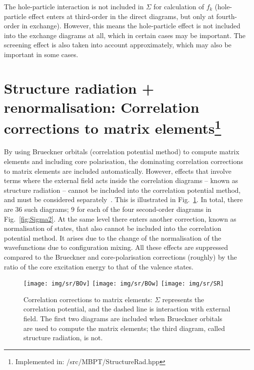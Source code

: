 \documentclass[10pt,twocolumn,a4paper]{article}%
\begin{document}
The hole-particle interaction is not included in $\Sigma$ for calculation of $f_k$
(hole-particle effect enters at third-order in the direct diagrams, but only at fourth-order in exchange).
However, this means the hole-particle effect is not included into the exchange diagrams at all, which in certain cases may be important.
The screening effect is also taken into account approximately, which may also be important in some cases.










\section[Structure radiation + renormalisation]{Structure radiation + renormalisation: Correlation corrections to matrix elements\footnote{Implemented in: /src/MBPT/StructureRad.hpp}}

By using Brueckner orbitals (correlation potential method) to compute matrix elements and including core polarisation, the dominating correlation corrections to matrix elements are included automatically.
However, effects that involve terms where the external field acts {\rm inside} the correlation diagrams -- known as structure radiation -- cannot be included into the correlation potential method, and must be considered separately~\cite{Blundell1987,Dzuba1987jpbRPA}.
This is illustrated in Fig.~\ref{fig:SR1}.
In total, there are 36 such diagrams; 9 for each of the four second-order diagrams in Fig.~\ref{fig:Sigma2}.
At the same level there enters another correction, known as normalisation of states, that also cannot be included into the correlation potential method. 
It arises due to the change of the normalisation of the wavefunctions due to configuration mixing.
All these effects are suppressed compared to the Brueckner and core-polarisation corrections (roughly) by the ratio of the core excitation energy to that of the valence states.

\begin{figure}%
\centering
\texttt{[image: img/sr/BOv]}
\texttt{[image: img/sr/BOw]}
\texttt{[image: img/sr/SR]}
\caption{\label{fig:SR1}\small Correlation corrections to matrix elements: $\Sigma$ represents the correlation potential, and the dashed line is interaction with external field. The first two diagrams are included when Brueckner orbitals are used to compute the matrix elements; the third diagram, called structure radiation, is not.}
\end{figure}
\end{document}
